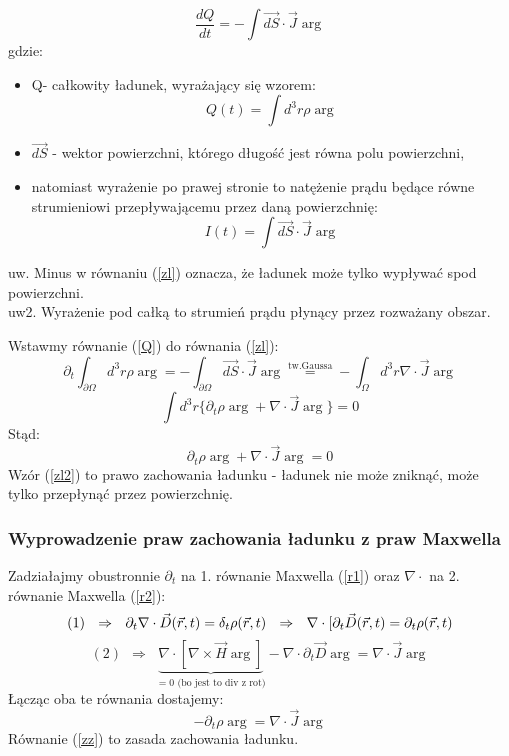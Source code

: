   \begin{equation}
  \frac{dQ}{dt}=-\int \vec{dS}\cdot\vec{J}\arg \label{zl}
  \end{equation}
  gdzie: 
  \begin{itemize}
  \item Q- całkowity ładunek, wyrażający się wzorem:
  \begin{equation}Q(t)=\int d^3r \rho\arg \label{Q} \end{equation}
  \item $\vec{dS}$  - wektor powierzchni, którego długość jest równa polu powierzchni, 
  \item natomiast wyrażenie po prawej stronie to natężenie prądu będące równe strumieniowi przepływającemu przez daną powierzchnię:
  \begin{equation}
  I(t)=\int \vec{dS}\cdot\vec{J}\arg 
  \end{equation}
  \end{itemize}
  uw. Minus w równaniu (\ref{zl}) oznacza, że ładunek może tylko wypływać spod powierzchni.\\
  uw2. Wyrażenie pod całką to strumień prądu płynący przez rozważany obszar.

  Wstawmy równanie (\ref{Q}) do równania (\ref{zl}):
  \begin{equation}
  \partial_t \int_{\partial\Omega} d^3r\rho\arg= -\int_{\partial\Omega}\vec{dS}\cdot\vec{J}\arg 
  \stackrel{\text{tw.Gaussa}}{=} -\int_\Omega d^3r\nabla\cdot\vec{J}\arg
  \end{equation}
  \begin{equation}
  \int d^3r\{\partial_t \rho\arg+\nabla \cdot\vec{J}\arg\}=0
  \end{equation}
  Stąd:
  \begin{equation}
  \partial_t \rho\arg+\nabla \cdot\vec{J}\arg=0 \label{zl2} \end{equation}
  Wzór (\ref{zl2}) to prawo zachowania ładunku - ładunek nie może zniknąć, może tylko przepłynąć przez powierzchnię.

  \subsubsection{Wyprowadzenie praw zachowania ładunku z praw Maxwella}
  Zadziałajmy obustronnie $\partial_t$ na 1. równanie Maxwella (\ref{r1}) oraz $\nabla\cdot$ na 2. równanie Maxwella (\ref{r2}):
  \begin{equation}
  (1)~~\Rightarrow ~~\partial_t \nabla\cdot \vec{D}(\vec{r},t)=\delta_t \rho(\vec{r},t) ~~\Rightarrow~~ \nabla\cdot[\partial_t\vec{D}(\vec{r},t)=\partial_t\rho(\vec{r},t) \end{equation}
   \begin{equation}
    (2)~~\Rightarrow~~ \underbrace{\nabla\cdot[\nabla\times\vec{H}\arg]}_{=0 \text{ (bo jest to div z rot)}}-\nabla\cdot\partial_t\vec{D}\arg=\nabla\cdot\vec{J}\arg
	\end{equation}
	Łącząc oba te równania dostajemy:
	\begin{equation}
	-\partial_t\rho\arg=\nabla\cdot\vec{J}\arg \label{zz}
	\end{equation}
	Równanie (\ref{zz}) to zasada zachowania ładunku.

